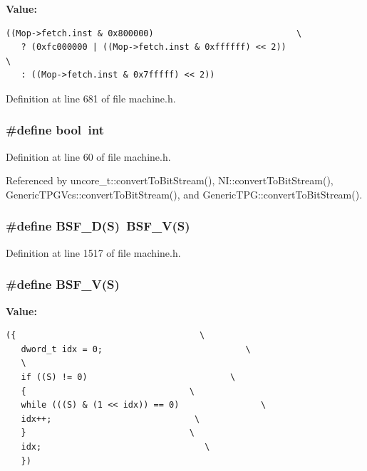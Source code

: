 \textbf{Value:}

\begin{Code}\begin{verbatim}((Mop->fetch.inst & 0x800000)                            \
   ? (0xfc000000 | ((Mop->fetch.inst & 0xffffff) << 2))                \
   : ((Mop->fetch.inst & 0x7fffff) << 2))
\end{verbatim}
\end{Code}


Definition at line 681 of file machine.h.
\subsubsection[{bool}]{\setlength{\rightskip}{0pt plus 5cm}\#define bool~int}\label{machine_8h_bb452686968e48b67397da5f97445f5b}




Definition at line 60 of file machine.h.

Referenced by uncore\_\-t::convertToBitStream(), NI::convertToBitStream(), GenericTPGVcs::convertToBitStream(), and GenericTPG::convertToBitStream().
\subsubsection[{BSF\_\-D}]{\setlength{\rightskip}{0pt plus 5cm}\#define BSF\_\-D(S)~BSF\_\-V(S)}\label{machine_8h_84ec9860375c8abb6e12e6e359521436}




Definition at line 1517 of file machine.h.
\subsubsection[{BSF\_\-V}]{\setlength{\rightskip}{0pt plus 5cm}\#define BSF\_\-V(S)}\label{machine_8h_a94f71b3780b84fcfe5df54484d76cbe}


\textbf{Value:}

\begin{Code}\begin{verbatim}({                                    \
   dword_t idx = 0;                            \
   \
   if ((S) != 0)                            \
   {                                \
   while (((S) & (1 << idx)) == 0)                \
   idx++;                            \
   }                                \
   idx;                                \
   })
\end{verbatim}
\end{Code}


